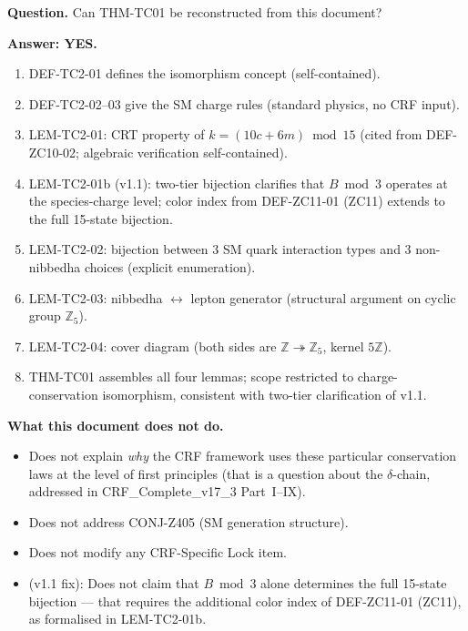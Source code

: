 \documentclass[12pt, a4paper]{article}
\begin{document}
\begin{formalbox}[title={Reconstruction Test (CUIP No-Loss, v1.1)}]
\textbf{Question.} Can THM-TC01 be reconstructed from this document?

\textbf{Answer: YES.}
\begin{enumerate}[leftmargin=*]
  \item DEF-TC2-01 defines the isomorphism concept (self-contained).
  \item DEF-TC2-02--03 give the SM charge rules (standard physics,
    no CRF input).
  \item LEM-TC2-01: CRT property of $k=(10c+6m)\bmod 15$ (cited from
    DEF-ZC10-02; algebraic verification self-contained).
  \item LEM-TC2-01b (v1.1): two-tier bijection clarifies that
    $B\bmod 3$ operates at the species-charge level; color index
    from DEF-ZC11-01 (ZC11) extends to the full 15-state bijection.
  \item LEM-TC2-02: bijection between 3 SM quark interaction types and
    3 non-nibbedha choices (explicit enumeration).
  \item LEM-TC2-03: nibbedha $\leftrightarrow$ lepton generator
    (structural argument on cyclic group $\mathbb{Z}_5$).
  \item LEM-TC2-04: cover diagram (both sides are
    $\mathbb{Z} \twoheadrightarrow \mathbb{Z}_5$, kernel $5\mathbb{Z}$).
  \item THM-TC01 assembles all four lemmas; scope restricted to
    charge-conservation isomorphism, consistent with two-tier
    clarification of v1.1.
\end{enumerate}

\textbf{What this document does not do.}
\begin{itemize}[leftmargin=*]
  \item Does not explain \emph{why} the CRF framework uses these
    particular conservation laws at the level of first principles
    (that is a question about the $\delta$-chain, addressed in
    CRF\_Complete\_v17\_3 Part~I--IX).
  \item Does not address CONJ-Z405 (SM generation structure).
  \item Does not modify any CRF-Specific Lock item.
  \item (v1.1 fix): Does not claim that $B\bmod 3$ alone determines
    the full 15-state bijection --- that requires the additional
    color index of DEF-ZC11-01 (ZC11), as formalised in LEM-TC2-01b.
\end{itemize}
\end{formalbox}
\end{document}
